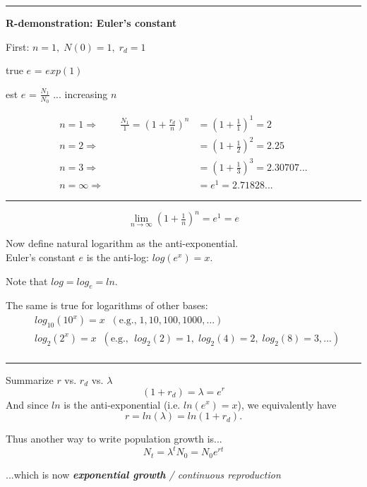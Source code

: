 \documentclass{article}
\newcommand{\note}[1]{\colorbox{gray!20}{#1}}
\begin{document}
\rule[0.5ex]{\linewidth}{1pt}

\textbf{R-demonstration: Euler's constant}

\note{First: $n=1, \; N(0)=1, \; r_d=1 $}

\note{true $e$ = $exp(1)$}

\note{est $e$ = $\tfrac{N_1}{N_0}$ ... increasing $n$}

\begin{align*}
	n=1 \Rightarrow & \;\;\; \frac{N_1}{1}=\left(1+\tfrac{r_d}{n}\right)^n &= \left(1+\tfrac{1}{1}\right)^1= 2 \\
	n=2 \Rightarrow & &= \left(1+\tfrac{1}{2}\right)^2= 2.25 \\
	n=3 \Rightarrow & &= \left(1+\tfrac{1}{3}\right)^3= 2.30707... \\
	n=\infty \Rightarrow & &=e^1 = 2.71828...
\end{align*}

\rule[0.5ex]{\linewidth}{1pt}

\begin{equation*}
		 \lim_{n \to \infty}\left(1+\tfrac{1}{n}\right)^n	= e^1=e
\end{equation*}

Now define natural logarithm as the anti-exponential.\\
Euler's constant $e$ is the anti-log: $log(e^x)=x$.

Note that $log=log_e=ln$.

The same is true for logarithms of other bases:
\begin{align*}
&	log_{10}(10^x)=x \;\; (\text{e.g.,}\; 1, 10, 100, 1000, ...)\\
&   log_2(2^x)=x \;\; (\text{e.g., }\; log_2(2)=1, \; log_2(4)=2, \; log_2(8)=3, ...)\\
\end{align*}

\rule[0.5ex]{\linewidth}{1pt}
Summarize $r$ vs. $r_d$ vs. $\lambda$
\begin{equation*}
	(1+r_d)=\lambda=e^r
\end{equation*}
And since $ln$ is the anti-exponential (i.e. $ln(e^x)=x$), we equivalently have
\begin{equation*}
	r = ln(\lambda) = ln(1+r_d).
\end{equation*}

Thus another way to write population growth is...
\begin{equation*}
	N_t=\lambda^t N_0 = N_0 e^{rt}
\end{equation*}
\begin{center}
...which is now \emph{\textbf{exponential growth} / continuous reproduction}
\end{center}
\end{document}

